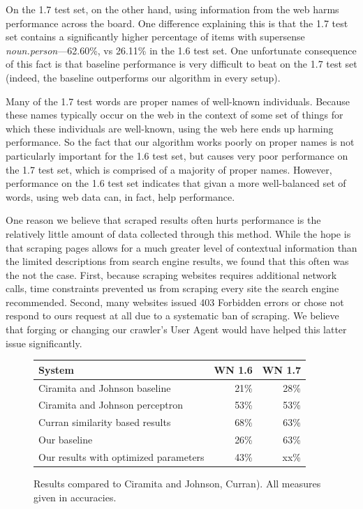 \documentclass{article}
\begin{document}
On the 1.7 test set, on the other hand, using information from the web harms performance across the board.
One difference explaining this is that the 1.7 test set contains a significantly higher percentage of items with supersense {\it noun.person}---62.60\%, vs 26.11\% in the 1.6 test set.
One unfortunate consequence of this fact is that baseline performance is very difficult to beat on the 1.7 test set (indeed, the baseline outperforms our algorithm in every setup).

Many of the 1.7 test words are proper names of well-known individuals.
Because these names typically occur on the web in the context of some set of things for which these individuals are well-known, using the web here ends up harming performance.
So the fact that our algorithm works poorly on proper names is not particularly important for the 1.6 test set, but causes very poor performance on the 1.7 test set, which is comprised of a majority of proper names.
However, performance on the 1.6 test set indicates that givan a more well-balanced set of words, using web data can, in fact, help performance.

One reason we believe that scraped results often hurts performance is the relatively little amount of data collected through this method.
While the hope is that scraping pages allows for a much greater level of contextual information than the limited descriptions from search engine results, we found that this often was the not the case.
First, because scraping websites requires additional network calls, time constraints prevented us from scraping every site the search engine recommended.
Second, many websites issued 403 Forbidden errors or chose not respond to ours request at all due to a systematic ban of scraping.
We believe that forging or changing our crawler's User Agent would have helped this latter issue significantly.

\begin{figure}[hbtp]
\begin{center}
\begin{tabular}{|l|r|r|}
    \hline
    \bf{System} & \bf{WN 1.6} & \bf{WN 1.7}\\
    \hline
    \hline
    Ciramita and Johnson baseline & 21\% & 28\%\\
    Ciramita and Johnson perceptron & 53\% & 53\%\\
    Curran similarity based results & 68\% & 63\%\\
    \hline
    Our baseline & 26\% & 63\%\\
    Our results with optimized parameters & 43\% & xx\%\\
    \hline
\end{tabular}
\caption{Results compared to Ciramita and Johnson, Curran).  All measures given in accuracies.}
\label{fig:compareresults}
\end{center}
\end{figure}
\end{document}
